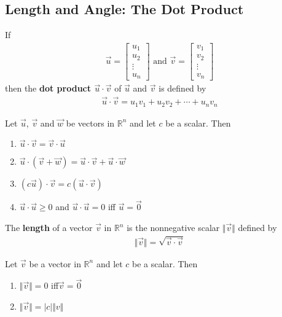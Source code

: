\documentclass{article}
\begin{document}
\subsection{Length and Angle: The Dot Product}
\begin{definition}
	If
	\begin{gather*}
		\vec u = \begin{bmatrix}
			u_1 \\u_2\\\vdots\\u_n
		\end{bmatrix} \text{  and  }
		\vec v = \begin{bmatrix}
			v_1 \\v_2\\\vdots\\v_n
		\end{bmatrix}
	\end{gather*}
	then the \textbf{dot product $\vec u \cdot \vec v$} of $\vec u$ and $\vec v$ is defined by
	\begin{gather*}
		\vec u \cdot \vec v = u_1v_1 + u_2v_2 + \cdots + u_nv_n
	\end{gather*}
\end{definition}
\begin{theorem}
	Let $\vec u$, $\vec v$ and $\vec w$ be vectors in $\mathbb{R}^n$ and let $c$ be a scalar. Then
	\begin{enumerate}
		\item $\vec u \cdot \vec v = \vec v \cdot \vec u$
		\item $\vec u \cdot (\vec v + \vec w) = \vec u \cdot \vec v + \vec u \cdot \vec w$
		\item $(c\vec u) \cdot \vec v = c(\vec u \cdot \vec v)$
		\item $\vec u \cdot \vec u \geq 0$ and $\vec u \cdot \vec u = 0$ iff $\vec u = \vec 0$
	\end{enumerate}
\end{theorem}
\begin{definition}
	The \textbf{length} of a vector $\vec v$ in $\mathbb{R}^n$ is the nonnegative scalar $\Vert\vec v\Vert$ defined by
	\begin{gather*}
		\Vert\vec v\Vert = \sqrt{\vec v \cdot \vec v}
	\end{gather*}
\end{definition}
\begin{theorem}
	Let $\vec v$ be a vector in $\mathbb{R}^n$ and let $c$ be a scalar. Then
	\begin{enumerate}
		\item $\Vert\vec v\Vert = 0$ iff$\vec v = \vec 0$
		\item $\Vert\vec v\Vert = |c|\Vert v\Vert$
	\end{enumerate}
\end{theorem}
\end{document}
